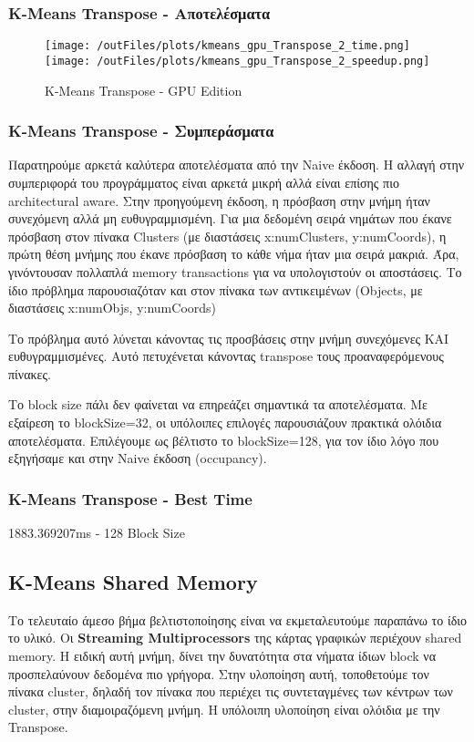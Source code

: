 \documentclass[../final_report.tex]{subfiles}
\begin{document}
\subsubsection*{K-Means Transpose - Αποτελέσματα}

\begin{figure}[H]
    \centering
    \texttt{[image: /outFiles/plots/kmeans\_gpu\_Transpose\_2\_time.png]}
    \texttt{[image: /outFiles/plots/kmeans\_gpu\_Transpose\_2\_speedup.png]}
    \caption{K-Means Transpose - GPU Edition}
    \label{fig:K-Means Transpose - GPU Edition}
\end{figure}

\subsubsection*{K-Means Transpose - Συμπεράσματα}
Παρατηρούμε αρκετά καλύτερα αποτελέσματα από την Naive έκδοση. Η αλλαγή στην συμπεριφορά του προγράμματος είναι 
αρκετά μικρή αλλά είναι επίσης πιο architectural aware. Στην προηγούμενη έκδοση, η πρόσβαση στην μνήμη ήταν συνεχόμενη αλλά
μη ευθυγραμμισμένη. Για μια δεδομένη σειρά νημάτων που έκανε πρόσβαση στον πίνακα Clusters (με διαστάσεις x:numClusters, y:numCoords),
η πρώτη θέση μνήμης που έκανε πρόσβαση το κάθε νήμα ήταν μια σειρά μακριά. Άρα, γινόντουσαν πολλαπλά memory transactions για να υπολογιστούν
οι αποστάσεις. Το ίδιο πρόβλημα παρουσιαζόταν και στον πίνακα των αντικειμένων (Objects, με διαστάσεις x:numObjs, y:numCoords)

Το πρόβλημα αυτό λύνεται κάνοντας τις προσβάσεις στην μνήμη συνεχόμενες ΚΑΙ ευθυγραμμισμένες. Αυτό πετυχένεται κάνοντας transpose τους προαναφερόμενους
πίνακες.

Το block size πάλι δεν φαίνεται να επηρεάζει σημαντικά τα αποτελέσματα. Με εξαίρεση το blockSize=32, οι υπόλοιπες επιλογές παρουσιάζουν
πρακτικά ολόιδια αποτελέσματα. Επιλέγουμε ως βέλτιστο το blockSize=128, για τον ίδιο λόγο που εξηγήσαμε και στην Naive έκδοση (occupancy).


\subsubsection*{K-Means Transpose - Best Time}
1883.369207ms - 128 Block Size


\subsection{K-Means Shared Memory}
Το τελευταίο άμεσο βήμα βελτιστοποίησης είναι να εκμεταλευτούμε παραπάνω το ίδιο το υλικό. Οι \textbf{Streaming Multiprocessors} της κάρτας
γραφικών περιέχουν shared memory. Η ειδική αυτή μνήμη, δίνει την δυνατότητα στα νήματα ίδιων block να προσπελαύνουν δεδομένα πιο γρήγορα. Στην υλοποίηση αυτή, τοποθετούμε
τον πίνακα cluster, δηλαδή τον πίνακα που περιέχει τις συντεταγμένες των κέντρων των cluster, στην διαμοιραζόμενη μνήμη. Η υπόλοιπη υλοποίηση
είναι ολόιδια με την Transpose.
\end{document}
